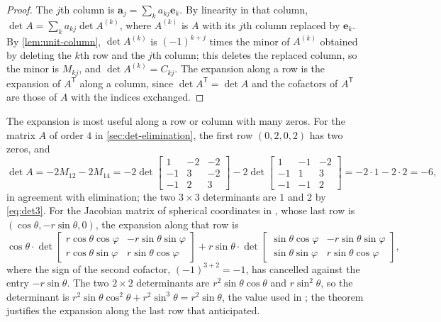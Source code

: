 \begin{proof}
The $j$th column is $\mathbf a_j=\sum_ka_{kj}\mathbf e_k$. By linearity in that column, $\det A=\sum_ka_{kj}\det A^{(k)}$, where $A^{(k)}$ is $A$ with its $j$th column replaced by $\mathbf e_k$. By \cref{lem:unit-column}, $\det A^{(k)}$ is $(-1)^{k+j}$ times the minor of $A^{(k)}$ obtained by deleting the $k$th row and the $j$th column; this deletes the replaced column, so the minor is $M_{kj}$, and $\det A^{(k)}=C_{kj}$. The expansion along a row is the expansion of $A^{\mathsf T}$ along a column, since $\det A^{\mathsf T}=\det A$ and the cofactors of $A^{\mathsf T}$ are those of $A$ with the indices exchanged.
\end{proof}

The expansion is most useful along a row or column with many zeros. For the matrix $A$ of order $4$ in \cref{sec:det-elimination}, the first row $(0,2,0,2)$ has two zeros, and
\[
\det A=-2M_{12}-2M_{14}=-2\det\begin{bmatrix}1&-2&-2\\-1&3&-2\\-1&2&3\end{bmatrix}-2\det\begin{bmatrix}1&-1&-2\\-1&1&3\\-1&-1&2\end{bmatrix}=-2\cdot1-2\cdot2=-6,
\]
in agreement with elimination; the two $3\times3$ determinants are $1$ and $2$ by \eqref{eq:det3}. For the Jacobian matrix of spherical coordinates in , whose last row is $(\cos\theta,-r\sin\theta,0)$, the expansion along that row is
\[
\cos\theta\cdot\det\begin{bmatrix}r\cos\theta\cos\varphi&-r\sin\theta\sin\varphi\\r\cos\theta\sin\varphi&r\sin\theta\cos\varphi\end{bmatrix}+r\sin\theta\cdot\det\begin{bmatrix}\sin\theta\cos\varphi&-r\sin\theta\sin\varphi\\\sin\theta\sin\varphi&r\sin\theta\cos\varphi\end{bmatrix},
\]
where the sign of the second cofactor, $(-1)^{3+2}=-1$, has cancelled against the entry $-r\sin\theta$. The two $2\times2$ determinants are $r^2\sin\theta\cos\theta$ and $r\sin^2\theta$, so the determinant is $r^2\sin\theta\cos^2\theta+r^2\sin^3\theta=r^2\sin\theta$, the value used in ; the theorem justifies the expansion along the last row that  anticipated.

